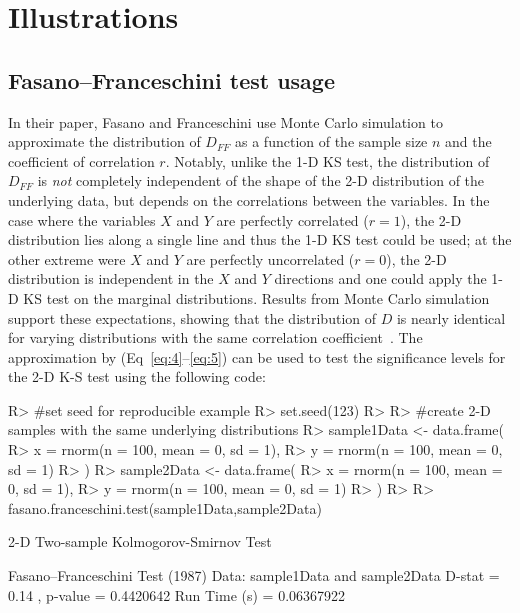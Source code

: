 \documentclass[codesnippet]{jss}
\begin{document}
\section{Illustrations} \label{sec:illustrations}

\subsection{Fasano--Franceschini test usage}

In their paper, Fasano and Franceschini use Monte Carlo simulation to
approximate the distribution of $D_{FF}$ as a function of the sample
size $n$ and the coefficient of correlation $r$. Notably, unlike the 1-D KS
test, the distribution of
$D_{FF}$ is \textit{not} completely independent of the shape of the 2-D distribution of the
underlying data, but depends on the correlations between the variables.
In the case where the variables $X$ and $Y$  are perfectly
correlated ($r = 1$), the 2-D distribution lies along a single line and thus
the 1-D KS test could be used; at the other extreme were $X$ and $Y$  are perfectly
uncorrelated ($r = 0$), the 2-D distribution is independent in the $X$
and $Y$ directions and one could apply the 1-D KS test on the marginal
distributions.
%
Results from Monte Carlo simulation support these expectations, showing
that the distribution of $D$ is nearly identical for varying
distributions with the same correlation coefficient~\citep{Fasano1987}.
The approximation
by  \cite{numericalRecipes} (Eq~\ref{eq:4}--\ref{eq:5})
can be used to test the significance levels for the 2-D K-S test using
the following code:
%
\begin{CodeChunk}
\begin{CodeInput}
R> #set seed for reproducible example
R> set.seed(123)
R>
R> #create 2-D samples with the same underlying distributions
R> sample1Data <- data.frame(
R>  x = rnorm(n = 100, mean = 0, sd = 1),
R>  y = rnorm(n = 100, mean = 0, sd = 1)
R> )
R> sample2Data <- data.frame(
R>  x = rnorm(n = 100, mean = 0, sd = 1),
R>  y = rnorm(n = 100, mean = 0, sd = 1)
R> )
R>
R> fasano.franceschini.test(sample1Data,sample2Data)
\end{CodeInput}
\begin{CodeOutput}
      2-D Two-sample Kolmogorov-Smirnov Test

 Fasano--Franceschini Test (1987)
 Data:  sample1Data and sample2Data
 D-stat =  0.14 , p-value =  0.4420642
 Run Time (s) =  0.06367922
\end{CodeOutput}
\end{CodeChunk}
\end{document}

